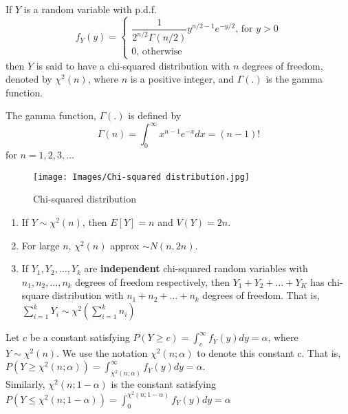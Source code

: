 \begin{definition}
If $Y$ is a random variable  with p.d.f.
$$
f_Y(y) = \begin{cases}
\dfrac{1}{2^{n/2}\Gamma(n/2)} y^{n/2 - 1} e^{-y/2} \text{, for } y > 0 \\
0 \text{, otherwise}
\end{cases}
$$ then $Y$ is said to have a chi-squared distribution with $n$ degrees of freedom, denoted by $\chi^2(n)$, where $n$ is a positive integer, and $\Gamma(.)$ is the gamma function. \\
\end{definition}
The gamma function, $\Gamma(.)$ is defined by 
$$
\Gamma(n) = \int_{0}^{\infty} x^{n-1} e^{-x} dx = (n-1)!
$$ for $n = 1, 2, 3, \dots $
\begin{figure}
    \centering
    \texttt{[image: Images/Chi-squared distribution.jpg]}
    \caption{Chi-squared distribution}
    \label{fig:my_label}
\end{figure}
\begin{note}
\end{note}
\begin{enumerate}
    \item If $Y \sim \chi^2(n)$, then $E[Y] = n$ and $V(Y) = 2n$.
    \item For large $n$, $\chi^2(n)$ approx $\sim N(n,2n)$.
    \item If $Y_1, Y_2, \dots, Y_k$ are \textbf{independent} chi-squared random variables with $n_1, n_2, \dots, n_k$ degrees of freedom respectively, then $Y_1 + Y_2 + \dots + Y_K$ has chi-square distribution with $n_1 + n_2 + \dots + n_k$ degrees of freedom. That is, $\sum_{i = 1}^k Y_i \sim \chi^2 \left( \sum_{i = 1}^k n_i\right)$
\end{enumerate}

Let $c$ be a constant satisfying $P(Y \geq c) = \int_{c}^{\infty} f_Y(y) dy = \alpha$, where $Y \sim \chi^2(n)$. We use the notation $\chi^2(n; \alpha)$ to denote this constant $c$. That is, $P(Y \geq \chi^2(n; \alpha)) = \int_{\chi^2(n; \alpha)}^{\infty} f_Y(y) dy = \alpha$. \\
Similarly, $\chi^2(n; 1 - \alpha)$ is the constant satisfying $P(Y \leq \chi^2(n; 1 - \alpha)) = \int_{0}^{\chi^2(n; 1 - \alpha)} f_Y(y)dy = \alpha$

